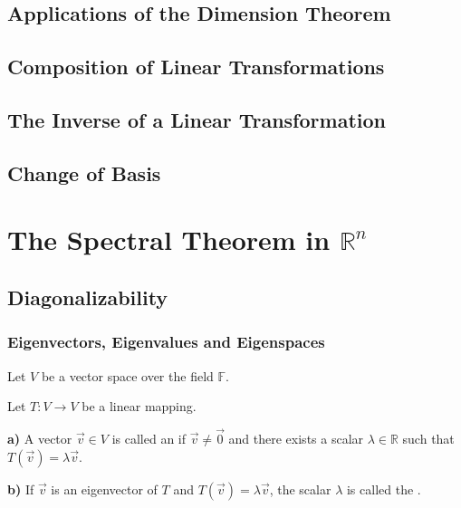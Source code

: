 \documentclass[11pt,fleqn]{book} %
\begin{document}
\section{Applications of the Dimension Theorem}

\section{Composition of Linear Transformations}

\section{The Inverse of a Linear Transformation}

\section{Change of Basis}

\chapter{The Spectral Theorem in $\mathbb{R}^n$}

\section{Diagonalizability}

\subsection{Eigenvectors, Eigenvalues and Eigenspaces}

\setcounter{chapter}{4}
\setcounter{definitionT}{1}
\begin{definition}

    Let $V$ be a vector space over the field $\mathbb{F}$.

    Let $T: V \to V$ be a linear mapping.

    \textbf{a)} A vector $\overrightarrow{v} \in V$ is called an  if $\overrightarrow{v} \neq \overrightarrow{0}$ and there exists a scalar $\lambda \in \mathbb{R}$ such that $T(\overrightarrow{v}) = \lambda \overrightarrow{v}$.

    \textbf{b)} If $\overrightarrow{v}$ is an eigenvector of $T$ and $T(\overrightarrow{v}) = \lambda\overrightarrow{v}$, the scalar $\lambda$ is called the .
\end{definition}
\end{document}
